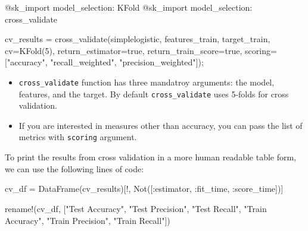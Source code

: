 \documentclass[
  letterpaper,
]{book}
\newenvironment{Shaded}{\begin{snugshade}}{\end{snugshade}}
\newcommand{\ConstantTok}[1]{\textcolor[rgb]{0.56,0.35,0.01}{#1}}
\newcommand{\FloatTok}[1]{\textcolor[rgb]{0.68,0.00,0.00}{#1}}
\newcommand{\FunctionTok}[1]{\textcolor[rgb]{0.28,0.35,0.67}{#1}}
\newcommand{\NormalTok}[1]{\textcolor[rgb]{0.00,0.23,0.31}{#1}}
\newcommand{\OperatorTok}[1]{\textcolor[rgb]{0.37,0.37,0.37}{#1}}
\newcommand{\PreprocessorTok}[1]{\textcolor[rgb]{0.68,0.00,0.00}{#1}}
\newcommand{\StringTok}[1]{\textcolor[rgb]{0.13,0.47,0.30}{#1}}
\providecommand{\tightlist}{%
  \setlength{\itemsep}{0pt}\setlength{\parskip}{0pt}}\usepackage{longtable,booktabs,array}
\begin{document}
\begin{Shaded}
\begin{Highlighting}[]
\PreprocessorTok{@sk\_import}\NormalTok{ model\_selection}\OperatorTok{:}\NormalTok{ KFold}
\PreprocessorTok{@sk\_import}\NormalTok{ model\_selection}\OperatorTok{:}\NormalTok{ cross\_validate}

\NormalTok{cv\_results }\OperatorTok{=} \FunctionTok{cross\_validate}\NormalTok{(simplelogistic, }
\NormalTok{        features\_train, target\_train, }
\NormalTok{            cv}\OperatorTok{=}\FunctionTok{KFold}\NormalTok{(}\FloatTok{5}\NormalTok{),}
\NormalTok{            return\_estimator}\OperatorTok{=}\ConstantTok{true}\NormalTok{,}
\NormalTok{            return\_train\_score}\OperatorTok{=}\ConstantTok{true}\NormalTok{, }
\NormalTok{            scoring}\OperatorTok{=}\NormalTok{[}\StringTok{"accuracy"}\NormalTok{,}
                 \StringTok{"recall\_weighted"}\NormalTok{, }\StringTok{"precision\_weighted"}\NormalTok{]);}
\end{Highlighting}
\end{Shaded}

\begin{itemize}
\tightlist
\item
  \texttt{cross\_validate} function has three mandatroy arguments: the
  model, features, and the target. By default \texttt{cross\_validate}
  uses 5-folds for cross validation.
\item
  If you are interested in measures other than accuracy, you can pass
  the list of metrics with \texttt{scoring} argument.
\end{itemize}

To print the results from cross validation in a more human readable
table form, we can use the following lines of code:

\begin{Shaded}
\begin{Highlighting}[]
\NormalTok{cv\_df }\OperatorTok{=} \FunctionTok{DataFrame}\NormalTok{(cv\_results)[!, }
        \FunctionTok{Not}\NormalTok{([}\OperatorTok{:}\NormalTok{estimator, }\OperatorTok{:}\NormalTok{fit\_time, }\OperatorTok{:}\NormalTok{score\_time])]}

\FunctionTok{rename!}\NormalTok{(cv\_df, [}\StringTok{"Test Accuracy"}\NormalTok{,}
                \StringTok{"Test Precision"}\NormalTok{,}
                \StringTok{"Test Recall"}\NormalTok{,}
                \StringTok{"Train Accuracy"}\NormalTok{,}
                \StringTok{"Train Precision"}\NormalTok{,}
                \StringTok{"Train Recall"}\NormalTok{])}
\end{Highlighting}
\end{Shaded}
\end{document}
